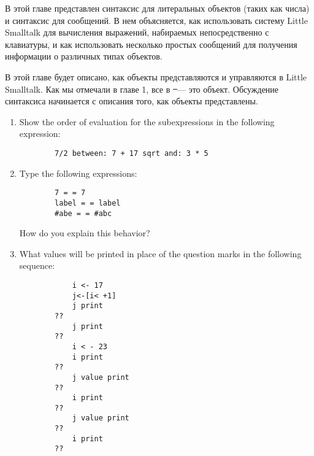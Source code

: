 \secdown

В этой главе представлен синтаксис для литеральных объектов (таких как числа) 
и синтаксис для сообщений. В нем объясняется, как использовать систему Little Smalltalk 
для вычисления выражений, набираемых непосредственно с клавиатуры, и как использовать 
несколько простых сообщений для получения информации о различных типах объектов.

\bigskip

В этой главе будет описано, как объекты представляются и 
управляются в Little Smalltalk. Как мы отмечали в главе 1, 
все в \st\ --- это объект. Обсуждение синтаксиса начинается 
с описания того, как объекты представлены.










\begin{enumerate}

    \item Show the order of evaluation for the subexpressions in the following
    expression:
    \begin{lstlisting}
        7/2 between: 7 + 17 sqrt and: 3 * 5
    \end{lstlisting}

    \item Type the following expressions:
    \begin{lstlisting}
        7 = = 7
        label = = label
        #abe = = #abc
    \end{lstlisting}
    How do you explain this behavior?
    
    \item What values will be printed in place of the question marks in the
    following sequence:
    \begin{lstlisting}
            i <- 17
            j<-[i< +1]
            j print
        ??
            j print
        ??
            i < - 23
            i print
        ??
            j value print
        ??
            i print
        ??
            j value print
        ??
            i print
        ??
    \end{lstlisting}

\end{enumerate}

\secup

